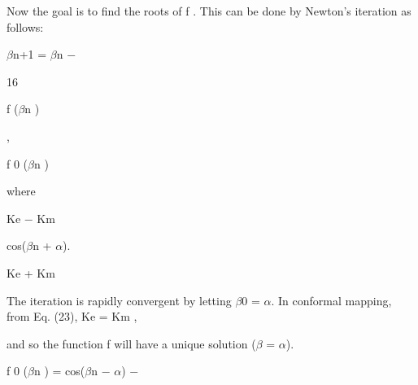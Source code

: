 \documentclass[a4paper,portrait,12pt]{article}
\begin{document}
\begin{flushleft}
Now the goal is to find the roots of f . This can be done by Newton's iteration as follows:
\end{flushleft}


\begin{flushleft}
$\beta$n+1 = $\beta$n $-$
\end{flushleft}





16





\begin{flushleft}
f ($\beta$n )
\end{flushleft}


,


\begin{flushleft}
f 0 ($\beta$n )
\end{flushleft}





\begin{flushleft}
\newpage
where
\end{flushleft}





\begin{flushleft}
Ke $-$ Km
\end{flushleft}


\begin{flushleft}
cos($\beta$n + $\alpha$).
\end{flushleft}


\begin{flushleft}
Ke + Km
\end{flushleft}


\begin{flushleft}
The iteration is rapidly convergent by letting $\beta$0 = $\alpha$. In conformal mapping, from Eq. (23), Ke = Km ,
\end{flushleft}


\begin{flushleft}
and so the function f will have a unique solution ($\beta$ = $\alpha$).
\end{flushleft}


\begin{flushleft}
f 0 ($\beta$n ) = cos($\beta$n $-$ $\alpha$) $-$
\end{flushleft}
\end{document}
